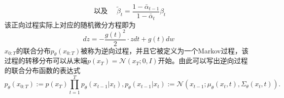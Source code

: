             \begin{equation}
                \text { 以及 } \quad \tilde{\beta}_t=\frac{1-\bar{\alpha}_{t-1}}{1-\bar{\alpha}_t} \beta_t
                \end{equation}
该正向过程实际上对应的随机微分方程即为
\begin{equation}
    dz = -\frac{g(t)^2}{2}\cdot  z dt + g(t)dw
\end{equation}
$x_{0:T}$的联合分布$p_{\theta}(x_{0:T})$被称为逆向过程，并且它被定义为一个Markov过程，该过程的转移分布可以从末端$p(x_T)= \mathcal{N}(x_T;0,I) $开始。由此可以写出逆向过程的联合分布函数的表达式
\begin{equation}
    p_{\theta}(x_{0:T}) := p(x_T)\prod_{t=1}^{T}p_{\theta}(x_{t-1}|x_t), p_{\theta}(x_{t-1}|x_t) :=\mathcal{N}(x_{t-1};\mu_{\theta}(x_t,t),\Sigma_{\theta}(x_t,t)).  
\end{equation}

